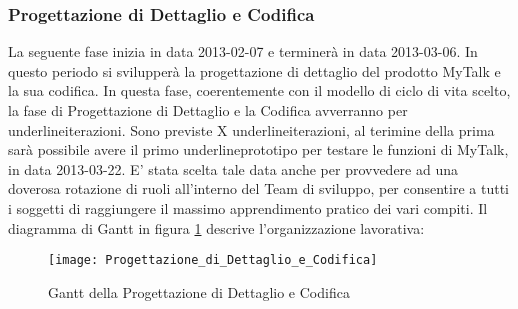 \clearpage
\subsubsection{Progettazione di Dettaglio e Codifica}
La seguente fase inizia in data 2013-02-07 e terminerà in data 2013-03-06. In questo periodo si svilupperà la progettazione di dettaglio del prodotto MyTalk e la sua codifica.
In questa fase, coerentemente con il modello di ciclo di vita scelto, la fase di Progettazione di Dettaglio e la Codifica avverranno per underline{iterazioni}.
Sono previste X underline{iterazioni}, al terimine della prima sarà possibile avere il primo underline{prototipo} per testare le funzioni di MyTalk, in data 2013-03-22.
E' stata scelta tale data anche per provvedere ad una doverosa rotazione di ruoli all'interno del Team di sviluppo, per consentire a tutti i soggetti di raggiungere il massimo apprendimento pratico dei vari compiti.
Il diagramma di Gantt in figura \ref{fig:gantdc} descrive l'organizzazione lavorativa:\\

\begin{figure}[h!]
  \texttt{[image: Progettazione\_di\_Dettaglio\_e\_Codifica]}
\caption{Gantt della Progettazione di Dettaglio e Codifica}\label{fig:gantdc}
\end{figure}

